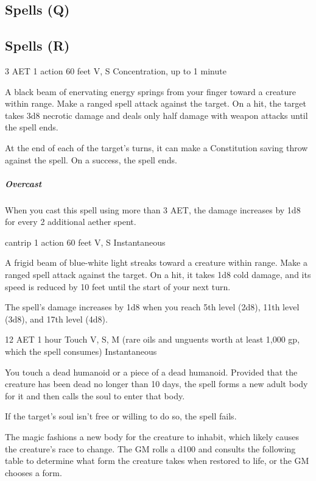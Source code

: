\subsection{Spells (Q)}

\subsection{Spells (R)}
\label{spell:ray-of-enfeeblement}
{3 AET}
{1 action}
{60 feet}
{V, S}
{Concentration, up to 1 minute}

A black beam of enervating energy springs from your finger toward a creature within range. Make a ranged spell attack against the target. On a hit, the target takes 3d8 necrotic damage and deals only half damage with weapon attacks until the spell ends.

At the end of each of the target's turns, it can make a Constitution saving throw against the spell. On a success, the spell ends.

\subparagraph*{Overcast} When you cast this spell using more than 3 AET, the damage increases by 1d8 for every 2 additional aether spent.

\label{spell:ray-of-frost}
{cantrip}
{1 action}
{60 feet}
{V, S}
{Instantaneous}

A frigid beam of blue-white light streaks toward a creature within range. Make a ranged spell attack against the target. On a hit, it takes 1d8 cold damage, and its speed is reduced by 10 feet until the start of your next turn.

The spell's damage increases by 1d8 when you reach 5th level (2d8), 11th level (3d8), and 17th level (4d8).

\label{spell:reincarnate}
{12 AET}
{1 hour}
{Touch}
{V, S, M (rare oils and unguents worth at least 1,000 gp, which the spell consumes)}
{Instantaneous}

You touch a dead humanoid or a piece of a dead humanoid. Provided that the creature has been dead no longer than 10 days, the spell forms a new adult body for it and then calls the soul to enter that body.

If the target's soul isn't free or willing to do so, the spell fails.

The magic fashions a new body for the creature to inhabit, which likely causes the creature's race to change. The GM rolls a d100 and consults the following table to determine what form the creature takes when restored to life, or the GM chooses a form.

